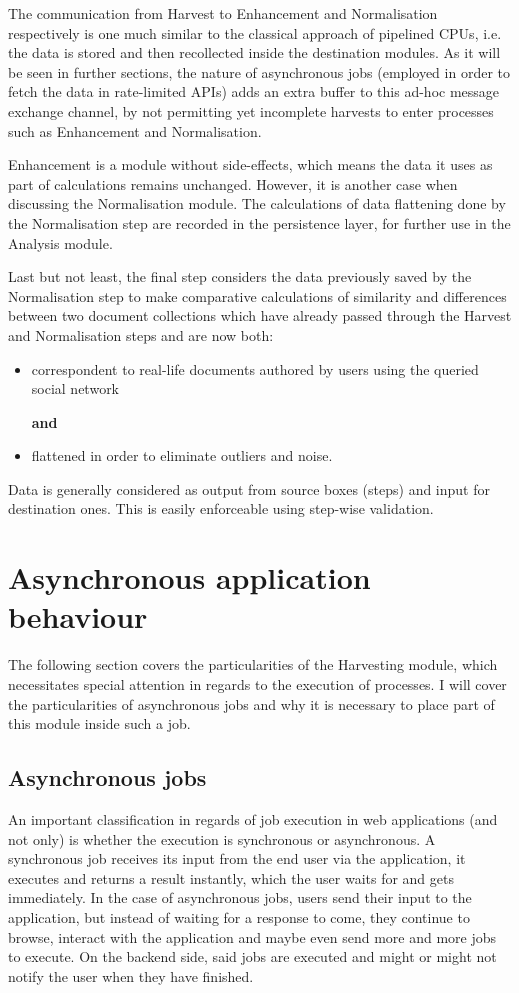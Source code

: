 \documentclass[12pt,a4paper,twoside]{report}
\begin{document}
The communication from Harvest to Enhancement and Normalisation respectively is one much similar to the classical approach of pipelined CPUs, i.e. the data is stored and then recollected inside the destination modules. As it will be seen in further sections, the nature of asynchronous jobs (employed in order to fetch the data in rate-limited APIs) adds an extra buffer to this ad-hoc message exchange channel, by not permitting yet incomplete harvests to enter processes such as Enhancement and Normalisation.

Enhancement is a module without side-effects, which means the data it uses as part of calculations remains unchanged. However, it is another case when discussing the Normalisation module. The calculations of data flattening done by the Normalisation step are recorded in the persistence layer, for further use in the Analysis module.

Last but not least, the final step considers the data previously saved by the Normalisation step to make comparative calculations of similarity and differences between two document collections which have already passed through the Harvest and Normalisation steps and are now both:

\begin{itemize}
\item correspondent to real-life documents authored by users using the queried social network

\textbf{and}
\item flattened in order to eliminate outliers and noise.
\end{itemize}

Data is generally considered as output from source boxes (steps) and input for destination ones. This is easily enforceable using step-wise validation.

\section{Asynchronous application behaviour}
The following section covers the particularities of the Harvesting module, which necessitates special attention in regards to the execution of processes. I will cover the particularities of asynchronous jobs and why it is necessary to place part of this module inside such a job.

\subsection{Asynchronous jobs}
An important classification in regards of job execution in web applications (and not only) is whether the execution is synchronous or asynchronous. A synchronous job receives its input from the end user via the application, it executes and returns a result instantly, which the user waits for and gets immediately. In the case of asynchronous jobs, users send their input to the application, but instead of waiting for a response to come, they continue to browse, interact with the application and maybe even send more and more jobs to execute. On the backend side, said jobs are executed and might or might not notify the user when they have finished.
\end{document}
